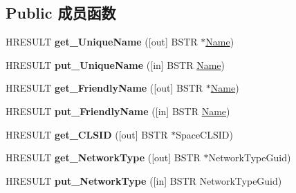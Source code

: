 \subsection*{Public 成员函数}
\begin{DoxyCompactItemize}
\item 
\mbox{\label{interface_i_tuning_space_a8479fc66ed67d2bcd6acb5e99f340447}} 
H\+R\+E\+S\+U\+LT {\bfseries get\+\_\+\+Unique\+Name} (\mbox{[}out\mbox{]} B\+S\+TR $\ast$\hyperlink{struct_name_rec__}{Name})
\item 
\mbox{\label{interface_i_tuning_space_abd7fbea652ebf9c866e30785d1dfb2be}} 
H\+R\+E\+S\+U\+LT {\bfseries put\+\_\+\+Unique\+Name} (\mbox{[}in\mbox{]} B\+S\+TR \hyperlink{struct_name_rec__}{Name})
\item 
\mbox{\label{interface_i_tuning_space_a87006ac07338cff86828a12261953b93}} 
H\+R\+E\+S\+U\+LT {\bfseries get\+\_\+\+Friendly\+Name} (\mbox{[}out\mbox{]} B\+S\+TR $\ast$\hyperlink{struct_name_rec__}{Name})
\item 
\mbox{\label{interface_i_tuning_space_af1485737f877eee2c1c9f265b30dbeb4}} 
H\+R\+E\+S\+U\+LT {\bfseries put\+\_\+\+Friendly\+Name} (\mbox{[}in\mbox{]} B\+S\+TR \hyperlink{struct_name_rec__}{Name})
\item 
\mbox{\label{interface_i_tuning_space_a250459bff9b77ba457782d07ed1856f9}} 
H\+R\+E\+S\+U\+LT {\bfseries get\+\_\+\+C\+L\+S\+ID} (\mbox{[}out\mbox{]} B\+S\+TR $\ast$Space\+C\+L\+S\+ID)
\item 
\mbox{\label{interface_i_tuning_space_a2cc426eb1301a4a198ba2db4e1d1a6ac}} 
H\+R\+E\+S\+U\+LT {\bfseries get\+\_\+\+Network\+Type} (\mbox{[}out\mbox{]} B\+S\+TR $\ast$Network\+Type\+Guid)
\item 
\mbox{\label{interface_i_tuning_space_ace158f1e4e6a1790aa78e98bc0d32853}} 
H\+R\+E\+S\+U\+LT {\bfseries put\+\_\+\+Network\+Type} (\mbox{[}in\mbox{]} B\+S\+TR Network\+Type\+Guid)
\item 
\mbox{\label{interface_i_tuning_space_a4d32407a3856d06c082aecf99637d37e}} 

\end{DoxyCompactItemize}
